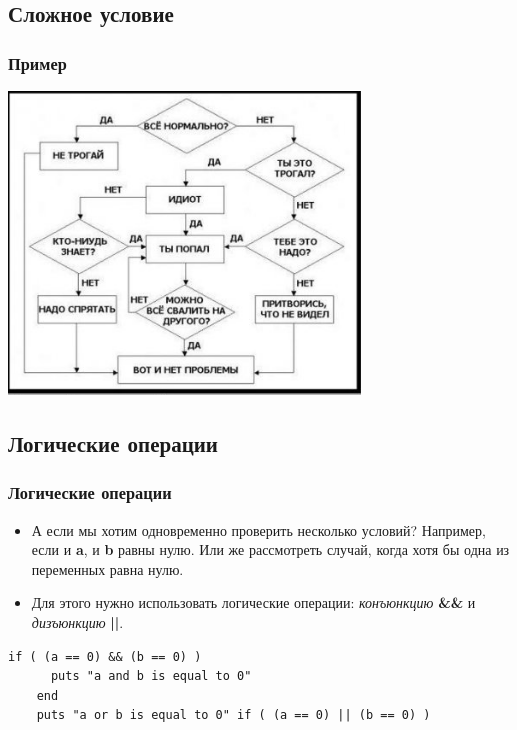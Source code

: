 \documentclass[compress,red]{beamer}
\begin{document}
\subsection{Сложное условие}
\begin{frame}
  \frametitle{Пример}
	\centerline{\includegraphics[width=0.7\textwidth]{images/how_to_fix_a_problem.png}}
\end{frame}

\subsection{Логические операции}
\begin{frame}[fragile]
  \frametitle{Логические операции}
  \begin{itemize}
    \item А если мы хотим одновременно проверить несколько условий? Например, если и \textbf{a}, и \textbf{b} равны нулю. Или же рассмотреть случай, когда хотя бы одна из переменных равна нулю.
    \item Для этого нужно использовать логические операции: \emph{конъюнкцию} \textbf{\&\&} и \emph{дизъюнкцию} \textbf{||}.
  \end{itemize}
  \scriptsize{
  \begin{lstlisting}[label=ruby6,caption=Конъюнкция и дизъюнкция]
    if ( (a == 0) && (b == 0) )
      puts "a and b is equal to 0"
    end
    puts "a or b is equal to 0" if ( (a == 0) || (b == 0) )
  \end{lstlisting}}

\end{frame}
\end{document}
